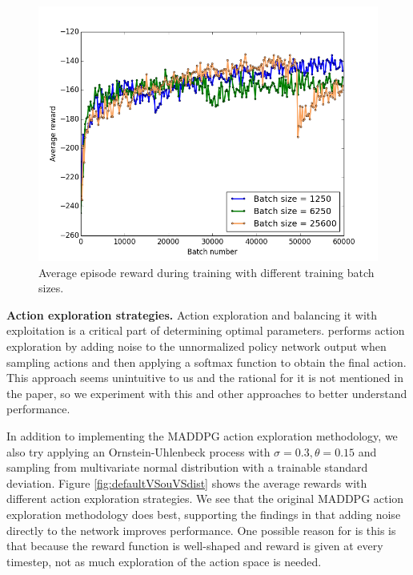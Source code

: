 \documentclass{article}
\begin{document}
\begin{figure}
\begin{center}
\includegraphics[scale=0.35]{batch_size}
\end{center}
\caption{Average episode reward during training with different training batch sizes.}
\label{fig:batch_size}
\end{figure}

\textbf{Action exploration strategies.} Action exploration and balancing it with exploitation is a critical part of determining optimal parameters. \cite{maddpg} performs action exploration by adding noise to the unnormalized policy network output when sampling actions and then applying a softmax function to obtain the final action. This approach seems unintuitive to us and the rational for it is not mentioned in the paper, so we experiment with this and other approaches to better understand performance.

In addition to implementing the MADDPG action exploration methodology, we also try applying an Ornstein-Uhlenbeck process with $\sigma = 0.3, \theta = 0.15$ and sampling from multivariate normal distribution with a trainable standard deviation. Figure \ref{fig:defaultVSouVSdist} shows the average rewards with different action exploration strategies. We see that the original MADDPG action exploration methodology does best, supporting the findings in \cite{plappert2017parameter} that adding noise directly to the network improves performance. One possible reason for is this is that because the reward function is well-shaped and reward is given at every timestep, not as much exploration of the action space is needed. 
\end{document}

